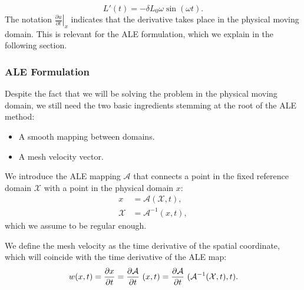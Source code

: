 \documentclass[../../thesis.tex]{subfiles}
\newcommand{\alemap}{\ensuremath{\mathcal{A}}}
\newcommand{\aleX}{\ensuremath{\mathcal{X}}}
\begin{document}
\begin{equation}
    L'(t) = - \delta L_0 \omega \sin(\omega t).
\end{equation}
The notation $\left.\frac{\partial u}{\partial t}\right|_{x}$ indicates that the derivative takes place in the physical moving domain. 
This is relevant for the ALE formulation, which we explain in the following section. 

\subsubsection{ALE Formulation}
Despite the fact that we will be solving the problem in the physical moving domain, 
we still need the two basic ingredients stemming at the root of the ALE method:
\begin{itemize}
    \item A smooth mapping between domains.
    \item A mesh velocity vector.
\end{itemize}

We introduce the ALE mapping $\alemap$ that connects a point in the fixed reference domain $\mathcal{X}$ with a point in the physical domain $x$:
\begin{subequations}
    \begin{align}
        x &= \alemap(\aleX, t), \\
        \aleX &= \alemap^{-1}(x, t),
    \end{align}
\end{subequations}
which we assume to be regular enough.

We define the mesh velocity as the time derivative of the spatial coordinate, which will coincide with the time derivative of the ALE map:
\begin{equation}
    w(x,t) = \pdv{x}{t} = \pdv{\alemap}{t} \ (x, t) = \pdv{\alemap}{t} \ (\alemap^{-1} (\aleX,t), t).
\end{equation}
\end{document}
